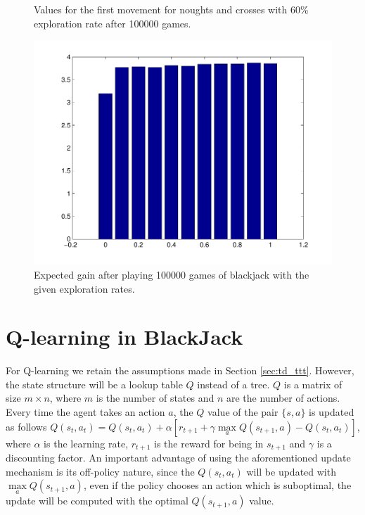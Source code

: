 \documentclass[12pt]{article}
\begin{document}
\begin{figure}[htbp!]
\begin{minipage}[t]{0.5\linewidth}
	\caption{Values for the first movement for noughts and crosses with 60\% exploration rate after 100000 games.}
	\label{fig:ttt_eps_0_6}
\end{minipage} 
\quad
\begin{minipage}[t]{0.45\linewidth}
	\includegraphics[scale=0.4]{images/blackjackExpectedGain2}
	\caption{Expected gain after playing 100000 games of blackjack with the given exploration rates.}
	\label{fig:blackjackExpectedGain}
\end{minipage}
\end{figure}

\section{Q-learning in BlackJack}

For Q-learning\cite{Sutton1998} we retain the assumptions made in Section \ref{sec:td_ttt}.
However, the state structure will be a lookup table $Q$ instead of a tree.
$Q$ is a matrix of size $m \times n$, where $m$ is the number of states and $n$ are the number of actions.
Every time the agent takes an action $a$, the $Q$ value of the pair $\lbrace s, a \rbrace$ is updated as follows $Q(s_t,a_t) = Q(s_t,a_t) + \alpha \left[ r_{t+1} + \gamma \max\limits_a Q(s_{t+1},a) - Q(s_t,a_t) \right]$, where $\alpha$ is the learning rate, $r_{t+1}$ is the reward for being in $s_{t+1}$ and $\gamma$ is a discounting factor.
An important advantage of using the aforementioned update mechanism is its off-policy nature, since the $Q(s_t,a_t)$ will be updated with $\max\limits_a Q(s_{t+1},a)$, even if the policy chooses an action which is suboptimal, the update will be computed with the optimal $Q(s_{t+1},a)$ value.
\end{document}
